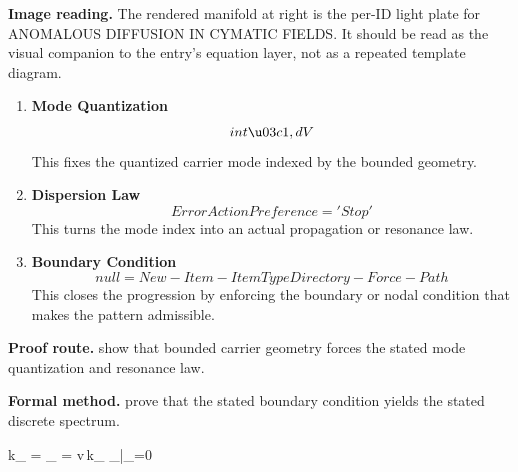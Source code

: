 \begin{samepage}
\noindent\begin{minipage}[t]{0.45\linewidth}
\vspace{0pt}
\raggedright
\scriptsize\textbf{Image reading.} The rendered manifold at right is the per-ID light plate for ANOMALOUS DIFFUSION IN CYMATIC FIELDS. It should be read as the visual companion to the entry's equation layer, not as a repeated template diagram.\par
\end{minipage}\hfill
\begin{minipage}[t]{0.53\linewidth}
\vspace*{-0.10in}
\raggedright
{}
\end{minipage}
\end{samepage}

\clearpage


\begin{enumerate}[leftmargin=1.6em,itemsep=9pt,topsep=6pt]
\item \textbf{Mode Quantization}
\[
int \u03c1,dV
\]
This fixes the quantized carrier mode indexed by the bounded geometry.

\item \textbf{Dispersion Law}
\[
ErrorActionPreference = 'Stop'
\]
This turns the mode index into an actual propagation or resonance law.

\item \textbf{Boundary Condition}
\[
null = New-Item -ItemType Directory -Force -Path
\]
This closes the progression by enforcing the boundary or nodal condition that makes the pattern admissible.
\end{enumerate}

\textbf{Proof route.} show that bounded carrier geometry forces the stated mode quantization and resonance law.

\textbf{Formal method.} prove that the stated boundary condition yields the stated discrete spectrum.

\medskip
{}

\begin{tzpsnapshot}
\end{tzpsnapshot}

\tzpequationlinks
  {k_{} = }
  {\omega_{} = v\,k_{}}
  {\Phi_{}|_{\partial\Omega}=0}
